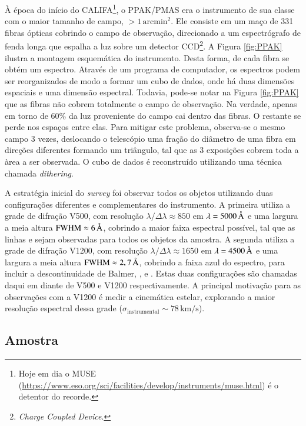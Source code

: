 À época do início do CALIFA\footnote{Hoje em dia o MUSE
(\url{https://www.eso.org/sci/facilities/develop/instruments/muse.html}) é o
detentor do recorde.}, o PPAK/PMAS era o instrumento de sua classe com o maior
tamanho de campo, $>1\,\mathrm{arcmin}^2$. Ele consiste em um maço de 331 fibras
ópticas cobrindo o campo de observação, direcionado a um espectrógrafo de fenda
longa que espalha a luz sobre um detector CCD\footnote{{\em Charge Coupled
Device}.}.
A Figura \ref{fig:PPAK} ilustra a montagem esquemática do instrumento. Desta
forma, de cada fibra se obtém um espectro. Através de um programa de computador,
os espectros podem ser reorganizados de modo a formar um cubo de dados, onde há
duas dimensões espaciais e uma dimensão espectral.
Todavia, pode-se notar na Figura \ref{fig:PPAK} que as fibras não cobrem
totalmente o campo de observação. Na verdade, apenas em torno de 60\% da luz
proveniente do campo cai dentro das fibras. O restante se perde nos espaços
entre elas. Para mitigar este problema, observa-se o mesmo campo 3 vezes,
deslocando o telescópio uma fração do diâmetro de uma fibra em direções
diferentes formando um triângulo, tal que as 3 exposições cobrem toda a àrea a
ser observada. O cubo de dados é reconstruído utilizando uma técnica chamada
{\em dithering}.


A estratégia inicial do {\em survey} foi observar todos os objetos utilizando
duas configurações diferentes e complementares do instrumento. A primeira
utiliza a grade de difração V500, com resolução $\lambda / \Delta\lambda \approx
850$ em $\lambda = 5000\,\text{\normalfont\AA}$ e uma largura a meia altura $\mathrm{FWHM}
\approx 6\,\text{\normalfont\AA}$, cobrindo a maior faixa espectral possível, tal que as
linhas \OII e \SII sejam observadas para todos os objetos da amostra.
A segunda utiliza a grade de difração V1200, com resolução $\lambda /
\Delta\lambda \approx 1650$ em $\lambda = 4500\,\text{\normalfont\AA}$ e uma largura a meia
altura $\mathrm{FWHM} \approx 2,7\,\text{\normalfont\AA}$, cobrindo a faixa azul do
espectro, para incluir a descontinuidade de Balmer, \Hdelta, \Hgamma e
.
Estas duas configurações são chamadas daqui em diante de V500 e V1200
respectivamente. A principal motivação para as observações com a V1200 é medir a
cinemática estelar, explorando a maior resolução espectral dessa grade
($\sigma_{\mathrm{instrumental}} \sim 78\, \mathrm{km}/\mathrm{s}$).


\subsection{Amostra}

